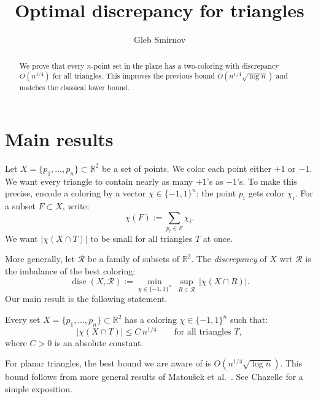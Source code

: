 \documentclass[12pt,reqno]{amsart}
\numberwithin{equation}{section}
\DeclareMathOperator{\disc}{disc}
\def \R {\mathbb{R}}
\begin{document}
\title[Optimal discrepancy for triangles]{Optimal discrepancy for triangles}

\author{Gleb Smirnov}
\address{
Mathematical Sciences Institute, 
Australian National University, Canberra, Australia}



\begin{abstract}
We prove that every $n$-point set in the plane has a two-coloring with discrepancy $O(n^{1/4})$ for all triangles. This improves the previous bound $O(n^{1/4}\sqrt{\log n})$ and matches the classical lower bound.
\end{abstract}

\maketitle

\setcounter{section}{0}


\section{Main results}\label{intro}
Let \(X=\{p_1,\ldots,p_n\}\subset\R^2\) be a set of points. We color each point either \(+1\) or \(-1\). We want every triangle to contain nearly as many \(+1\)'s as \(-1\)'s. To make this precise, encode a coloring by a vector \(\chi\in\{-1,1\}^n\): the point \(p_i\) gets color \(\chi_i\). For a subset 
\(F\subset X\), write:
\[
\chi(F):=\sum_{p_i\in F}\chi_i.
\]
We want \(|\chi(X\cap T)|\) to be small for all triangles \(T\) at once.
\smallskip%

More generally, let \(\mathcal R\) be a family of subsets of \(\R^2\). The \emph{discrepancy} of \(X\) wrt \(\mathcal R\) is the imbalance of the best coloring:
\[
\disc(X,\mathcal R):=\min_{\chi\in\{-1,1\}^n}\ \sup_{R\in\mathcal R}\,|\chi(X\cap R)|.
\]
Our main result is the following statement.
\begin{theorem}\label{thm:triangles}
Every set \(X=\{p_1,\ldots,p_n\}\subset\R^2\) has a coloring \(\chi\in\{-1,1\}^n\) such that:
\[
|\chi(X\cap T)|\le C\,n^{1/4}\qquad\text{for all triangles }T,
\]
where \(C>0\) is an absolute constant.
\end{theorem}
For planar triangles, the best bound we are aware of is \(O(n^{1/4}\sqrt{\log n})\). This bound follows from more general results of Matou\v{s}ek et al.\ \cite{MWW}. See Chazelle \cite[\S\,1.4]{Chaz} for a simple exposition. 
\smallskip%
\end{document}
